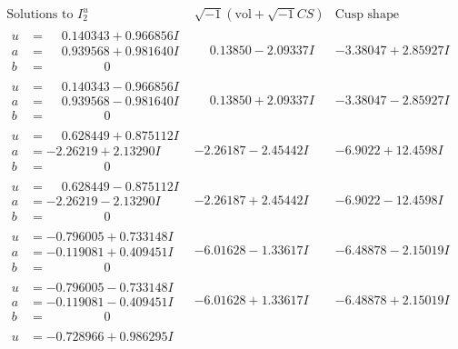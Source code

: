 \documentclass[1p]{elsarticle_modified}
\theoremstyle{definition}
\newcommand{\I}{\sqrt{-1}}
\begin{document}
$$\begin{array}{c|c|c}  
\text{Solutions to }I^u_{2}& \I (\text{vol} + \sqrt{-1}CS) & \text{Cusp shape}\\
 \hline 
\begin{aligned}
u &= \phantom{-}0.140343 + 0.966856 I \\
a &= \phantom{-}0.939568 + 0.981640 I \\
b &= \phantom{-0.000000 } 0\end{aligned}
 & \phantom{-}0.13850 - 2.09337 I & -3.38047 + 2.85927 I \\ \hline\begin{aligned}
u &= \phantom{-}0.140343 - 0.966856 I \\
a &= \phantom{-}0.939568 - 0.981640 I \\
b &= \phantom{-0.000000 } 0\end{aligned}
 & \phantom{-}0.13850 + 2.09337 I & -3.38047 - 2.85927 I \\ \hline\begin{aligned}
u &= \phantom{-}0.628449 + 0.875112 I \\
a &= -2.26219 + 2.13290 I \\
b &= \phantom{-0.000000 } 0\end{aligned}
 & -2.26187 - 2.45442 I & -6.9022 + 12.4598 I \\ \hline\begin{aligned}
u &= \phantom{-}0.628449 - 0.875112 I \\
a &= -2.26219 - 2.13290 I \\
b &= \phantom{-0.000000 } 0\end{aligned}
 & -2.26187 + 2.45442 I & -6.9022 - 12.4598 I \\ \hline\begin{aligned}
u &= -0.796005 + 0.733148 I \\
a &= -0.119081 + 0.409451 I \\
b &= \phantom{-0.000000 } 0\end{aligned}
 & -6.01628 - 1.33617 I & -6.48878 - 2.15019 I \\ \hline\begin{aligned}
u &= -0.796005 - 0.733148 I \\
a &= -0.119081 - 0.409451 I \\
b &= \phantom{-0.000000 } 0\end{aligned}
 & -6.01628 + 1.33617 I & -6.48878 + 2.15019 I \\ \hline\begin{aligned}
u &= -0.728966 + 0.986295 I \\

\end{aligned}
\end{array}$$
\end{document}

